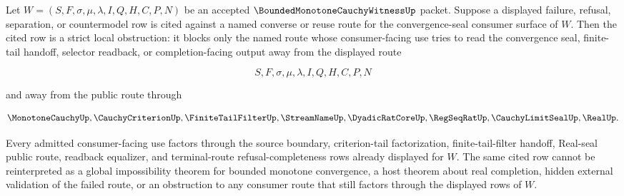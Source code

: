 \begin{corollary}
\label{cor:bounded-monotone-cauchy-witness-convergence-seal-strict-local-obstruction}
Let $W=(S,F,\sigma,\mu,\lambda,I,Q,H,C,P,N)$ be an accepted $\BoundedMonotoneCauchyWitnessUp$ packet. Suppose a displayed failure, refusal, separation, or countermodel row is cited against a named converse or reuse route for the convergence-seal consumer surface of $W$. Then the cited row is a strict local obstruction: it blocks only the named route whose consumer-facing use tries to read the convergence seal, finite-tail handoff, selector readback, or completion-facing output away from the displayed route

$$
S,F,\sigma,\mu,\lambda,I,Q,H,C,P,N
$$

and away from the public route through

$$
\MonotoneCauchyUp,\CauchyCriterionUp,\FiniteTailFilterUp,\StreamNameUp,\DyadicRatCoreUp,\RegSeqRatUp,\CauchyLimitSealUp,\RealUp.
$$

Every admitted consumer-facing use factors through the source boundary, criterion-tail factorization, finite-tail-filter handoff, Real-seal public route, readback equalizer, and terminal-route refusal-completeness rows already displayed for $W$. The same cited row cannot be reinterpreted as a global impossibility theorem for bounded monotone convergence, a host theorem about real completion, hidden external validation of the failed route, or an obstruction to any consumer route that still factors through the displayed rows of $W$.
\end{corollary}
